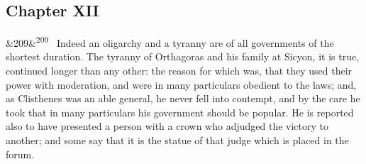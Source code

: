 \documentclass[12pt]{article}
\newcommand{\para}[1][]{\par\noindent\ifx&#1&\else\textsuperscript{\footnotesize #1}~\fi}
\begin{document}
\subsection*{Chapter XII}

\para[209] Indeed an oligarchy and a tyranny are of all governments of the shortest duration. The tyranny of Orthagoras and his family at Sicyon, it is true, continued longer than any other: the reason for which was, that they used their power with moderation, and were in many particulars obedient to the laws; and, as Clisthenes was an able general, he never fell into contempt, and by the care he took that in many particulars his government should be popular. He is reported also to have presented a person with a crown who adjudged the victory to another; and some say that it is the statue of that judge which is placed in the forum.
\end{document}
